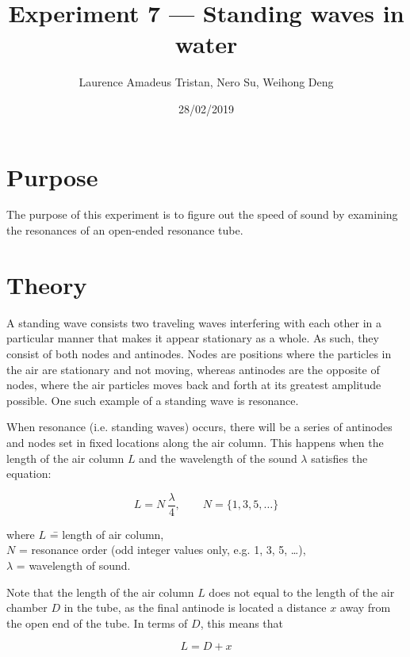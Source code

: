 \documentclass[letter]{article}
\title{Experiment 7 — Standing waves in water}
\author{Laurence Amadeus Tristan, Nero Su, Weihong Deng}
\date{28/02/2019}
\numberwithin{equation}{section}
\begin{document}
\maketitle

\section{Purpose}
The purpose of this experiment is to figure out the speed of sound by examining the resonances of an open-ended resonance tube.

\section{Theory}
A standing wave consists two traveling waves interfering with each other in a particular manner that makes it appear stationary as a whole. As such, they consist of both nodes and antinodes. Nodes are positions where the particles in the air are stationary and not moving, whereas antinodes are the opposite of nodes, where the air particles moves back and forth at its greatest amplitude possible. One such example of a standing wave is resonance.

When resonance (i.e. standing waves) occurs, there will be a series of antinodes and nodes set in fixed locations along the air column.  This happens when the length of the air column \(L\) and the wavelength of the sound \(\lambda\) satisfies the equation:

\begin{equation} \label{eq:t1}
  L = N \ \frac{\lambda}{4}, \qquad N = \{1, 3, 5, \ldots\}
\end{equation}

\begin{tabbing}
  where \= \(L\) \= = length of air column, \\
  \> \(N\) \> = resonance order (odd integer values only, e.g. 1, 3, 5, \ldots), \\
  \> \(\lambda\) \> = wavelength of sound.
\end{tabbing}

Note that the length of the air column \(L\) does not equal to the length of the air chamber \(D\) in the tube, as the final antinode is located a distance \(x\) away from the open end of the tube. In terms of \(D\), this means that

\begin{equation} \label{eq:t2}
  L = D + x
\end{equation}
\end{document}

